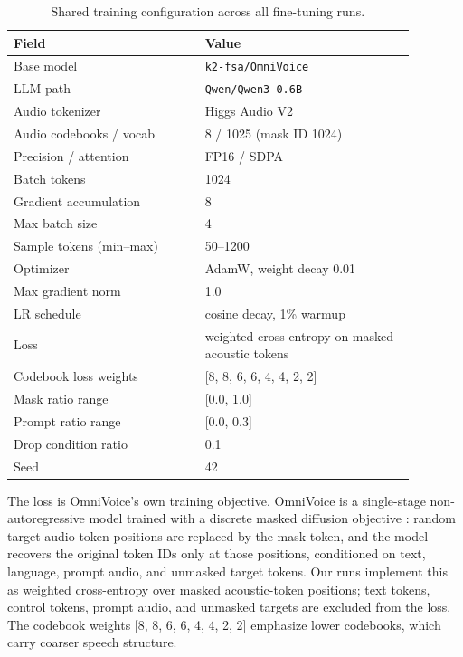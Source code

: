 \documentclass[sigconf,nonacm]{acmart}
\begin{document}
\begin{table}[t]
  \centering
  \caption{Shared training configuration across all fine-tuning runs.}
  \label{tab:shared-config}
  \small
  \begin{tabular}{P{0.42\linewidth}P{0.46\linewidth}}
    \toprule
    Field & Value \\
    \midrule
    Base model & \texttt{k2-fsa/OmniVoice} \\
    LLM path & \texttt{Qwen/Qwen3-0.6B} \\
    Audio tokenizer & Higgs Audio V2 \\
    Audio codebooks / vocab & 8 / 1025 (mask ID 1024) \\
    Precision / attention & FP16 / SDPA \\
    Batch tokens & 1024 \\
    Gradient accumulation & 8 \\
    Max batch size & 4 \\
    Sample tokens (min--max) & 50--1200 \\
    Optimizer & AdamW, weight decay 0.01 \\
    Max gradient norm & 1.0 \\
    LR schedule & cosine decay, 1\% warmup \\
    Loss & weighted cross-entropy on masked acoustic tokens \\
    Codebook loss weights & [8, 8, 6, 6, 4, 4, 2, 2] \\
    Mask ratio range & [0.0, 1.0] \\
    Prompt ratio range & [0.0, 0.3] \\
    Drop condition ratio & 0.1 \\
    Seed & 42 \\
    \bottomrule
  \end{tabular}
\end{table}

The loss is OmniVoice's own training objective. OmniVoice is a single-stage non-autoregressive model trained with a discrete masked diffusion objective \cite{omnivoice}: random target audio-token positions are replaced by the mask token, and the model recovers the original token IDs only at those positions, conditioned on text, language, prompt audio, and unmasked target tokens. Our runs implement this as weighted cross-entropy over masked acoustic-token positions; text tokens, control tokens, prompt audio, and unmasked targets are excluded from the loss. The codebook weights [8, 8, 6, 6, 4, 4, 2, 2] emphasize lower codebooks, which carry coarser speech structure.
\end{document}
